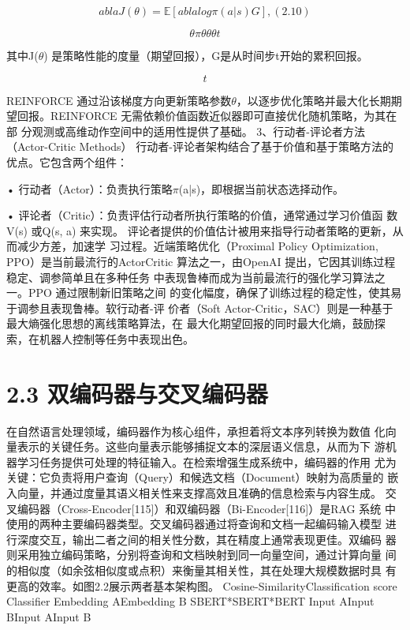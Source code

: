 \documentclass[12pt,a4paper,openright,UTF8]{ctexbook}
\begin{document}
\begin{equation*}
 abla J(\theta) = \mathbb{E}[ abla log \pi(a|s) G] ,(2.10)
\end{equation*}

\begin{equation*}
\theta\pi\theta\theta\theta t
\end{equation*}

其中J($\theta$) 是策略性能的度量（期望回报），G是从时间步t开始的累积回报。

\begin{equation*}
t
\end{equation*}

REINFORCE 通过沿该梯度方向更新策略参数$\theta$，以逐步优化策略并最大化长期期 望回报。REINFORCE 无需依赖价值函数近似器即可直接优化随机策略，为其在部 分观测或高维动作空间中的适用性提供了基础。 3、行动者-评论者方法（Actor-Critic Methods） 行动者-评论者架构结合了基于价值和基于策略方法的优点。它包含两个组件：

• 行动者（Actor）：负责执行策略$\pi$(a|s)，即根据当前状态选择动作。

• 评论者（Critic）：负责评估行动者所执行策略的价值，通常通过学习价值函
数V(s) 或Q(s, a) 来实现。 评论者提供的价值估计被用来指导行动者策略的更新，从而减少方差，加速学 习过程。近端策略优化（Proximal Policy Optimization, PPO）是当前最流行的ActorCritic 算法之一，由OpenAI 提出，它因其训练过程稳定、调参简单且在多种任务 中表现鲁棒而成为当前最流行的强化学习算法之一。PPO 通过限制新旧策略之间 的变化幅度，确保了训练过程的稳定性，使其易于调参且表现鲁棒。软行动者-评 价者（Soft Actor-Critic，SAC）则是一种基于最大熵强化思想的离线策略算法，在 最大化期望回报的同时最大化熵，鼓励探索，在机器人控制等任务中表现出色。

\section{2.3 双编码器与交叉编码器}

在自然语言处理领域，编码器作为核心组件，承担着将文本序列转换为数值 化向量表示的关键任务。这些向量表示能够捕捉文本的深层语义信息，从而为下 游机器学习任务提供可处理的特征输入。在检索增强生成系统中，编码器的作用 尤为关键：它负责将用户查询（Query）和候选文档（Document）映射为高质量的 嵌入向量，并通过度量其语义相关性来支撑高效且准确的信息检索与内容生成。 交叉编码器（Cross-Encoder[115]）和双编码器（Bi-Encoder[116]）是RAG 系统 中使用的两种主要编码器类型。交叉编码器通过将查询和文档一起编码输入模型 进行深度交互，输出二者之间的相关性分数，其在精度上通常表现更佳。双编码 器则采用独立编码策略，分别将查询和文档映射到同一向量空间，通过计算向量 间的相似度（如余弦相似度或点积）来衡量其相关性，其在处理大规模数据时具 有更高的效率。如图2.2展示两者基本架构图。 Cosine-SimilarityClassification score Classifier Embedding AEmbedding B SBERT*SBERT*BERT Input AInput BInput AInput B
\end{document}
